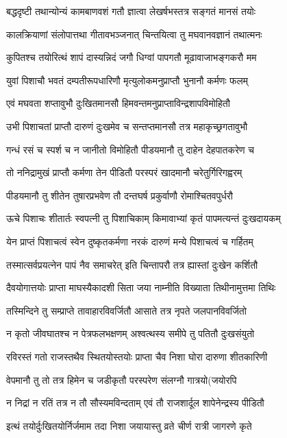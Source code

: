 \twolineshloka
{बद्धदृष्टी तथान्योन्यं कामबाणवशं गतौ}
{ज्ञात्वा लेखर्षभस्तत्र सङ्गतं मानसं तयोः} %

\twolineshloka
{कालक्रियाणां संलोपात्तथा गीतावभञ्जनात्}
{चिन्तयित्वा तु मघवानवज्ञानं तथात्मनः} %

\twolineshloka
{कुपितश्च तयोरित्थं शापं दास्यन्निदं जगौ}
{धिग्वां पापगतौ मूढावाजाभङ्गकरौ मम} %

\twolineshloka
{युवां पिशाचौ भवतं दम्पतीरूपधारिणौ}
{मृत्युलोकमनुप्राप्तौ भुनानौ कर्मणः फलम्} %

\twolineshloka
{एवं मघवता शप्तावुभौ दुःखितमानसौ}
{हिमवन्तमनुप्राप्ताविन्द्रशापविमोहितौ} %

\twolineshloka
{उभी पिशाचतां प्राप्तौ दारुणं दुःखमेव च}
{सन्तप्तमानसौ तत्र महाकृच्छ्रगतावुभौ} %

\twolineshloka
{गन्धं रसं च स्पर्श च न जानीतो विमोहितौ}
{पीडयमानौ तु दाहेन देहपातकरेण च} %

\twolineshloka
{तो ननिद्रामुखं प्राप्तौ कर्मणा तेन पीडितौ}
{परस्परं खादमानौ चरेतुर्गिरिगह्वरम्} %

\twolineshloka
{पीडयमानौ तु शीतेन तुषारप्रभवेण तौ}
{दन्तघर्ष प्रकुर्वाणौ रोमाश्चितवपुर्धरौ} %

\twolineshloka
{ऊचे पिशाचः शीतार्तः स्वपत्नी तु पिशाचिकाम्}
{किमावाभ्यां कृतं पापमत्यन्तं दुःखदायकम्} %

\twolineshloka
{येन प्राप्तं पिशाचत्वं स्वेन दुष्कृतकर्मणा}
{नरकं दारुणं मन्ये पिशाचत्वं च गर्हितम्} %

\twolineshloka
{तस्मात्सर्वप्रयत्नेन पापं नैव समाचरेत्}
{इति चिन्तापरौ तत्र ह्यास्तां दुःखेन कर्शितौ} %

\twolineshloka
{दैवयोगात्तयोः प्राप्ता माघस्यैकादशी सिता}
{जया नाम्नीति विख्याता तिथीनामुत्तमा तिथिः} %

\twolineshloka
{तस्मिन्दिने तु सम्प्राप्ते तावाहारविवर्जितौ}
{आसाते तत्र नृपते जलपानविवर्जितो} %

\twolineshloka
{न कृतो जीवघातश्च न पेत्रफलभक्षणम्}
{अश्वत्थस्य समीपे तु पतितौ दुःखसंयुतो} %

\twolineshloka
{रविरस्तं गतो राजस्तथैव स्थितयोस्तयोः}
{प्राप्ता चैव निशा घोरा दारुणा शीतकारिणी} %

\twolineshloka
{वेपमानौ तु तो तत्र हिमेन च जडीकृतौ}
{परस्परेण संलग्नौ गात्रयो(जयोरपि} %

\twolineshloka
{न निद्रां न रतिं तत्र न तौ सौस्यमविन्दताम्}
{एवं तौ राजशार्दूल शापेनेन्द्रस्य पीडितौ} %

\twolineshloka
{इत्थं तयोर्दुःखितयोर्निर्जमाम तदा निशा}
{जयायास्तु व्रते चीर्ण रात्री जागरणे कृते} %

